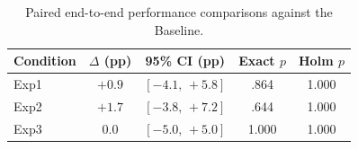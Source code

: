 \begin{table}[htbp]
    \centering
    \caption{Paired end-to-end performance comparisons against the Baseline.}
    \label{tab:paired-statistical-comparison}

    \begin{tabular}{lcccc}
        \toprule
        Condition & \(\Delta\) (pp) & 95\% CI (pp) & Exact \(p\) & Holm \(p\) \\
        \midrule
        Exp1 & \(+0.9\) & \([-4.1,\,+5.8]\) & .864 & 1.000 \\
        Exp2 & \(+1.7\) & \([-3.8,\,+7.2]\) & .644 & 1.000 \\
        Exp3 & \(0.0\)  & \([-5.0,\,+5.0]\) & 1.000 & 1.000 \\
        \bottomrule
    \end{tabular}
\end{table}
